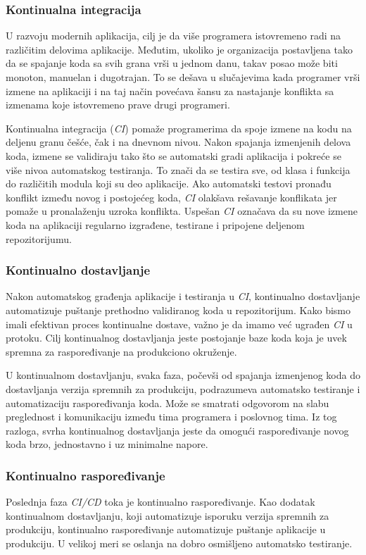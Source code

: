 \subsubsection{Kontinualna integracija}
U razvoju modernih aplikacija, cilj je da više programera istovremeno radi na različitim delovima 
aplikacije. Međutim, ukoliko je organizacija postavljena tako da se spajanje koda sa svih grana 
vrši u jednom danu, takav posao može biti monoton, manuelan i dugotrajan. To se dešava u slučajevima 
kada programer vrši izmene na aplikaciji i na taj način povećava šansu za nastajanje konflikta sa 
izmenama koje istovremeno prave drugi programeri.

Kontinualna integracija (\textit{CI}) pomaže programerima da spoje izmene na kodu na deljenu granu češće, 
čak i na dnevnom nivou. Nakon spajanja izmenjenih delova koda, izmene se validiraju tako što se 
automatski gradi aplikacija i pokreće se više nivoa automatskog testiranja. To znači da se testira 
sve, od klasa i funkcija do različitih modula koji su deo aplikacije. Ako automatski testovi pronađu 
konflikt između novog i postojećeg koda, \textit{CI} olakšava rešavanje konflikata jer pomaže u 
pronalaženju uzroka konflikta. Uspešan \textit{CI} označava da su nove izmene koda 
na aplikaciji regularno izgrađene, testirane i pripojene deljenom repozitorijumu.

\subsubsection{Kontinualno dostavljanje}
Nakon automatskog građenja aplikacije i testiranja u \textit{CI}, kontinualno dostavljanje automatizuje 
puštanje prethodno validiranog koda u repozitorijum. Kako bismo imali efektivan proces kontinualne 
dostave, važno je da imamo već ugrađen \textit{CI} u protoku. Cilj kontinualnog dostavljanja jeste postojanje 
baze koda koja je uvek spremna za raspoređivanje na produkciono okruženje.

U kontinualnom dostavljanju, svaka faza, počevši od spajanja izmenjenog koda do dostavljanja 
verzija spremnih za produkciju, podrazumeva automatsko testiranje i automatizaciju raspoređivanja 
koda. Može se smatrati odgovorom na slabu preglednost i komunikaciju između tima 
programera i poslovnog tima. Iz tog razloga, svrha kontinualnog dostavljanja jeste da omogući 
raspoređivanje novog koda brzo, jednostavno i uz minimalne napore.

\subsubsection{Kontinualno raspoređivanje}
Poslednja faza \textit{CI/CD} toka je kontinualno raspoređivanje. Kao dodatak kontinualnom dostavljanju, 
koji automatizuje isporuku verzija spremnih za produkciju, kontinualno raspoređivanje automatizuje 
puštanje aplikacije u produkciju. U velikoj meri se oslanja na dobro osmišljeno automatsko testiranje.

